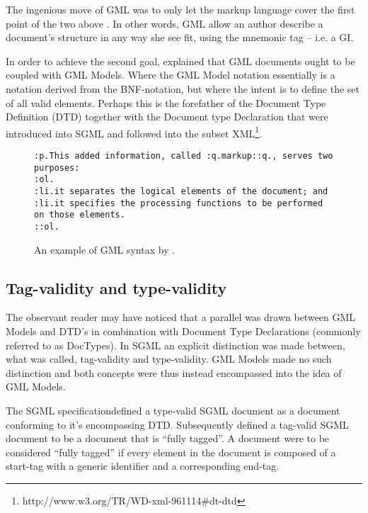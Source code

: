 \documentclass{scrreprt}
\begin{document}
The ingenious move of GML was to only let the markup language cover the first point of the two above \citet{goldfarb}. In other words, GML allow an author describe a document's structure in any way she see fit, using the mnemonic tag -- i.e. a GI.

In order to achieve the second goal, \citet{goldfarb} explained that GML documents ought to be coupled with GML Models. Where the GML Model notation essentially is a notation derived from the BNF-notation, but where the intent is to define the set of all valid elements. Perhaps this is the forefather of the Document Type Definition (DTD) together with the Document type Declaration that were introduced into SGML and followed into the subset XML\footnote{http://www.w3.org/TR/WD-xml-961114\#dt-dtd}.

\begin{figure}[h]
\centering
\begin{lstlisting}
:p.This added information, called :q.markup::q., serves two purposes: 
:ol.
:li.it separates the logical elements of the document; and 
:li.it specifies the processing functions to be performed on those elements. 
::ol.
\end{lstlisting}
\caption{An example of GML syntax by \citet{goldfarb}.}
\end{figure}




\subsection{Tag-validity and type-validity}
\label{sec:tag-validity-type-validity}
The observant reader may have noticed that a parallel was drawn between GML Models and DTD's in combination with Document Type Declarations (commonly referred to as DocTypes). In SGML an explicit distinction was made between, what was called, tag-validity and type-validity. GML Models made no such distinction and both concepts were thus instead encompassed into the idea of GML Models.

The SGML specification defined a type-valid SGML document as a document conforming to it's encompassing DTD. Subsequently defined a tag-valid SGML document to be a document that is ``fully tagged''. A document were to be considered ``fully tagged'' if every element in the document is composed of a start-tag with a generic identifier and a corresponding end-tag.
\end{document}
